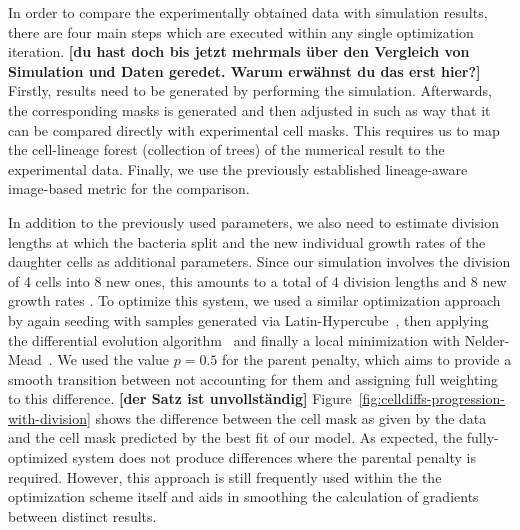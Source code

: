 \documentclass[10pt,letterpaper]{article}
\begin{document}
In order to compare the experimentally obtained data with simulation results, there are four main
steps which are executed within any single optimization iteration.
{\bf [du hast doch bis jetzt mehrmals über den Vergleich von Simulation und Daten geredet. Warum erwähnst du das erst hier?]}
Firstly, results need to be generated by performing the simulation.
Afterwards, the corresponding masks is generated and then adjusted in such as way that it can be
compared directly with experimental cell masks.
This requires us to map the cell-lineage forest (collection of trees) of the numerical result to the
experimental data. Finally, we use the previously established lineage-aware image-based metric for
the comparison.

In addition to the previously used parameters, we also need to estimate division lengths at
which the bacteria split and the new individual growth rates of the daughter cells as additional
parameters.
Since our simulation involves the division of 4 cells into 8 new ones, this amounts to a total of
$4$ division lengths and $8$ new growth rates .
To optimize this system, we used a similar optimization approach by again seeding with samples
generated via Latin-Hypercube~\cite{McKay1979}, then applying the differential evolution
algorithm~\cite{Storn1997} and finally a local minimization with Nelder-Mead~\cite{Gao2010}.
We used the value $p=0.5$ for the parent penalty, which aims to provide a smooth transition between
not accounting for them and assigning full weighting to this difference.
{\bf [der Satz ist unvollständig]}
Figure~\ref{fig:celldiffs-progression-with-division} shows the difference between the cell mask as
given by the data and the cell mask predicted by the best fit of our model.
As expected, the fully-optimized system does not produce differences where the parental penalty is
required.
However, this approach is still frequently used within the the optimization scheme itself and aids
in smoothing the calculation of gradients between distinct results.
\end{document}
